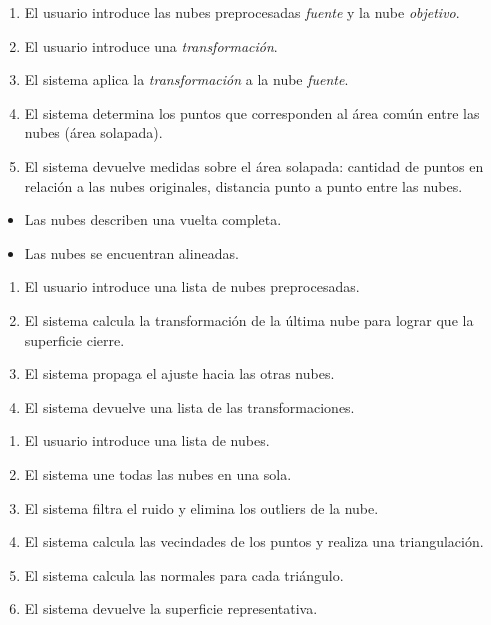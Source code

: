 		\CUNormal
		\begin{enumerate}
			\item El usuario introduce las nubes preprocesadas \emph{fuente} y la nube \emph{objetivo}. 
			\item El usuario introduce una \emph{transformación}.
			\item El sistema aplica la \emph{transformación} a la nube \emph{fuente}.
			\item El sistema determina los puntos que corresponden al área común entre las nubes (área solapada).
			\item El sistema devuelve medidas sobre el área solapada:
				cantidad de puntos en relación a las nubes originales,
				distancia punto a punto entre las nubes.
		\end{enumerate}


		\begin{itemize}
			\item Las nubes describen una vuelta completa.
			\item Las nubes se encuentran alineadas.
		\end{itemize}
		\CUNormal
		\begin{enumerate}
			\item El usuario introduce una lista de nubes preprocesadas. 
			\item El sistema calcula la transformación de la última nube para lograr que la superficie cierre. 
			\item El sistema propaga el ajuste hacia las otras nubes.
			\item El sistema devuelve una lista de las transformaciones.
		\end{enumerate}


		\CUNormal
		\begin{enumerate}
			\item El usuario introduce una lista de nubes.
			\item El sistema une todas las nubes en una sola.
			\item El sistema filtra el ruido y elimina los outliers de la nube.
			\item El sistema calcula las vecindades de los puntos y realiza una triangulación.
			\item El sistema calcula las normales para cada triángulo.
			\item El sistema devuelve la superficie representativa.
		\end{enumerate}

